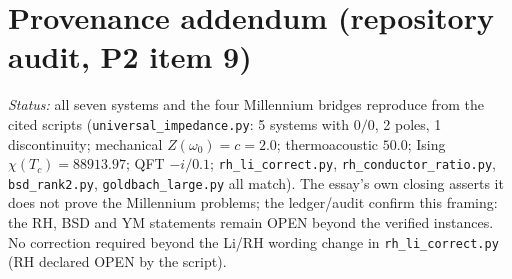 \documentclass[11pt]{article}
\begin{document}
\section*{Provenance addendum (repository audit, P2 item 9)}

{\small
\emph{Status:} all seven systems and the four Millennium bridges reproduce
from the cited scripts (\texttt{universal\_impedance.py}: 5 systems with
$0/0$, 2 poles, 1 discontinuity; mechanical $Z(\omega_0)=c=2.0$;
thermoacoustic $50.0$; Ising $\chi(T_c)=88913.97$; QFT $-i/0.1$;
\texttt{rh\_li\_correct.py}, \texttt{rh\_conductor\_ratio.py},
\texttt{bsd\_rank2.py}, \texttt{goldbach\_large.py} all match).  The essay's
own closing asserts it does not prove the Millennium problems; the
ledger/audit confirm this framing: the RH, BSD and YM statements remain
OPEN beyond the verified instances.  No correction required beyond the
Li/RH wording change in \texttt{rh\_li\_correct.py} (RH declared OPEN by the
script).}
\end{document}
